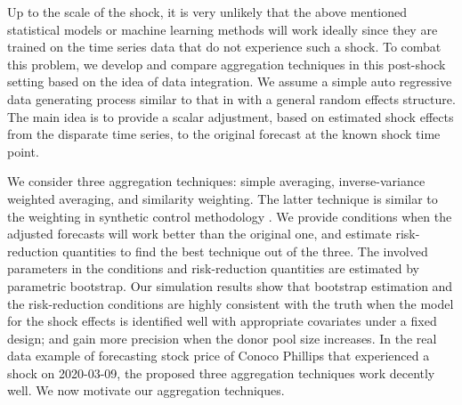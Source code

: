 \documentclass[11pt]{article}
\theoremstyle{definition}
\begin{document}
Up to the scale of the shock, it is very unlikely that the above mentioned  statistical models or machine learning methods will work ideally since they are trained on the time series data that do not experience such a shock. To combat this problem, we develop and compare aggregation techniques in this post-shock setting based on the idea of data integration. We assume a simple auto regressive data generating process similar to that in \citet{blundell1998initial} with a general random effects structure. The main idea is to provide a scalar adjustment, based on estimated shock effects from the disparate time series, to the original forecast at the known shock time point. 

We consider three aggregation techniques: simple averaging, inverse-variance weighted averaging, and similarity weighting. The latter technique is similar to the weighting in synthetic control methodology \citep{abadie2010synthetic}. We provide conditions  when the adjusted forecasts will work better than the original one, and estimate risk-reduction quantities to find the best technique out of the three. The involved parameters in the conditions and risk-reduction quantities are estimated by parametric bootstrap. Our simulation results show that  bootstrap estimation and the risk-reduction conditions are highly consistent with the truth when the model for the shock effects is identified well with appropriate covariates under a fixed design; and gain more precision when the donor pool size increases. In the real data example of forecasting stock price of Conoco Phillips that experienced a shock on 2020-03-09, the proposed three aggregation techniques work decently well. We now motivate our aggregation techniques.




\end{document}
